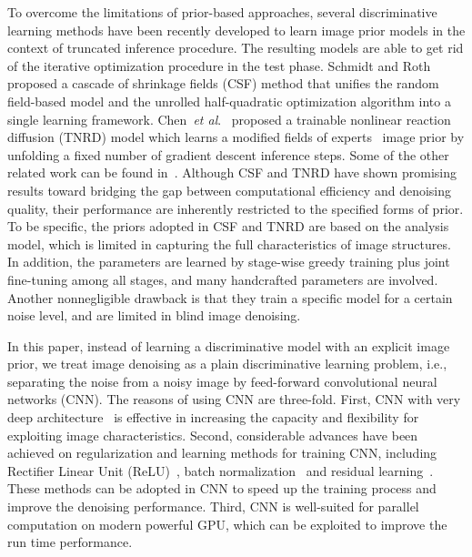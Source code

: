 \documentclass[journal]{IEEEtran}
\begin{document}
To overcome the limitations of prior-based approaches, several discriminative learning methods have been recently
developed to learn image prior models in the context of truncated inference procedure. The resulting models are able to get rid of the iterative optimization procedure in the test phase.
Schmidt and Roth~\cite{schmidt2014shrinkage} proposed a cascade of shrinkage fields (CSF) method that unifies the random field-based model and the unrolled half-quadratic optimization algorithm into a single learning framework. Chen~\emph{et al}.~\cite{chen2015learning,chen2015trainable} proposed a trainable nonlinear reaction diffusion (TNRD) model which learns a modified fields of experts~\cite{roth2009fields} image prior by unfolding a fixed number of gradient descent inference steps. Some of the other related work can be found in~\cite{schmidt2013discriminative,Schmidtpami}.
Although CSF and TNRD have shown promising results toward bridging the gap between computational efficiency and denoising quality, their performance are inherently restricted to the specified forms of prior. To be specific, the priors adopted in CSF and TNRD are based on the analysis model, which is limited in capturing the full characteristics of image structures. In addition, the parameters are learned by stage-wise greedy training plus joint fine-tuning among all stages, and many handcrafted parameters are involved. Another nonnegligible drawback is that they train a specific model for a certain noise level, and are limited in blind image denoising.



In this paper, instead of learning a discriminative model with an explicit image prior, we treat image denoising as a plain discriminative learning problem, i.e., separating the noise from a noisy image by feed-forward convolutional neural networks (CNN).
The reasons of using CNN are three-fold. First, CNN with very deep architecture~\cite{simonyan2014very} is effective in increasing the capacity and flexibility for exploiting image characteristics. Second, considerable advances have been achieved on regularization and learning methods for training CNN, including Rectifier Linear Unit (ReLU)~\cite{krizhevsky2012imagenet}, batch normalization~\cite{ioffe2015batch} and residual learning~\cite{he2015deep}. These methods can be adopted in CNN to speed up the training process and improve the denoising performance. Third, CNN is well-suited for parallel computation on modern powerful GPU, which can be exploited to improve the run time performance.
\end{document}
